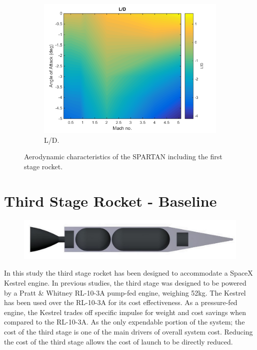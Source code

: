 \begin{figure}
\begin{subfigure}{.5\textwidth}
		\includegraphics[width=0.99\linewidth]{figures/3_vehicle_design/FirstStageLD}
		\caption{L/D.}
		\label{fig:LD-EFirstStage}
	\end{subfigure}
	\caption{Aerodynamic characteristics of the SPARTAN including the first stage rocket.}
	\label{fig:FirstStageAero}
\end{figure}


	

	\section{Third Stage Rocket - Baseline}\label{sec:ThirdStageBaseline}
	
	\begin{figure}
\centering
\includegraphics[width=0.7\linewidth]{figures/3_vehicle_design/3rdStage}
\caption{}
\label{fig:3rdStage}
\end{figure}
	
	In this study the third stage rocket has been designed to accommodate a SpaceX Kestrel engine. In previous studies, the third stage was designed to be powered by a Pratt \& Whitney RL-10-3A pump-fed engine, weighing 52kg. The Kestrel has been used over the RL-10-3A for its cost effectiveness. As a pressure-fed engine, the Kestrel trades off specific impulse for weight and cost savings when compared to the RL-10-3A. As the only expendable portion of the system; the cost of the third stage is one of the main drivers of overall system cost. Reducing the cost of the third stage allows the cost of launch to be directly reduced. 
	
